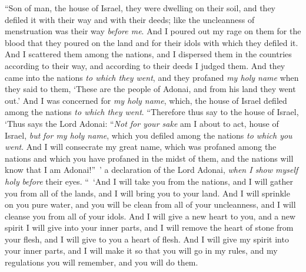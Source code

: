 \begin{biblechapter}
\verse “Son of man, the house of Israel, they were dwelling on their soil, and they defiled it with their way and with their deeds; like the uncleanness of menstruation was their way \textit{before me}.
\verse And I poured out my rage on them for the blood that they poured on the land and for their idols with which they defiled it.
\verse And I scattered them among the nations, and I dispersed them in the countries according to their way, and according to their deeds I judged them.
\verse And they came into the nations \textit{to which they went}, and they profaned \textit{my holy name} when they said to them, ‘These are the people of Adonai, and from his land they went out.’
\verse And I was concerned for \textit{my holy name}, which, the house of Israel defiled among the nations \textit{to which they went}.
\verse “Therefore thus say to the house of Israel, ‘Thus says the Lord Adonai: “\textit{Not for your sake}  am I about to act, house of Israel, \textit{but} \textit{for my holy name}, which you defiled among the nations \textit{to which you went}.
\verse And I will consecrate my great name, which was profaned among the nations and which you have profaned in the midst of them, and the nations will know that I am Adonai!” ’ a declaration of the Lord Adonai, \textit{when I show myself holy} \textit{before} their eyes.
\verse “ ‘And I will take you from the nations, and I will gather you from all of the lands, and I will bring you to your land.
\verse And I will sprinkle on you pure water, and you will be clean from all of your uncleanness, and I will cleanse you from all of your idols.
\verse And I will give a new heart to you, and a new spirit I will give into your inner parts, and I will remove the heart of stone from your flesh, and I will give to you a heart of flesh.
\verse And I will give my spirit into your inner parts, and I will make it so that you will go in my rules, and my regulations you will remember, and you will do them.

\end{biblechapter}
